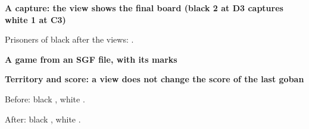 \documentclass{article}
\newcommand\case[1]{\par\medskip\noindent\textbf{#1}\par\nopagebreak}
\begin{document}
\case{A capture: the view shows the final board (black 2 at D3 captures white 1 at C3)}
\begin{goban}[5, captures, name = ko]
\end{goban}
  
Prisoners of black after the views: .

\case{A game from an SGF file, with its marks}
\begin{goban}[9, name = game]\end{goban}
 

\case{Territory and score: a view does not change the score of the last goban}
\begin{goban}[5, name = score]
\end{goban}
Before: black , white .
 

After: black , white .
\end{document}
